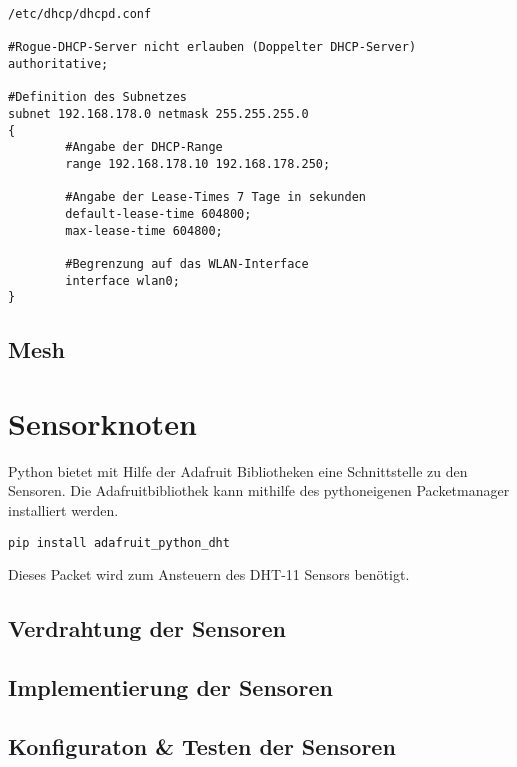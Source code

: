 \begin{verbatim}
/etc/dhcp/dhcpd.conf

#Rogue-DHCP-Server nicht erlauben (Doppelter DHCP-Server)
authoritative;

#Definition des Subnetzes
subnet 192.168.178.0 netmask 255.255.255.0
{
        #Angabe der DHCP-Range
        range 192.168.178.10 192.168.178.250;

        #Angabe der Lease-Times 7 Tage in sekunden
        default-lease-time 604800;
        max-lease-time 604800;

        #Begrenzung auf das WLAN-Interface
        interface wlan0;
}

\end{verbatim}
%

\subsection{Mesh}
\section{Sensorknoten} %
Python bietet mit Hilfe der Adafruit\cite{Adafruit60:online} Bibliotheken eine Schnittstelle zu den Sensoren. Die Adafruitbibliothek kann mithilfe des pythoneigenen Packetmanager installiert werden.
\begin{verbatim}
pip install adafruit_python_dht
\end{verbatim}
Dieses Packet wird zum Ansteuern des DHT-11 Sensors benötigt.
\subsection{Verdrahtung der Sensoren}

\subsection{Implementierung der Sensoren}
\subsection{Konfiguraton \& Testen der Sensoren}
